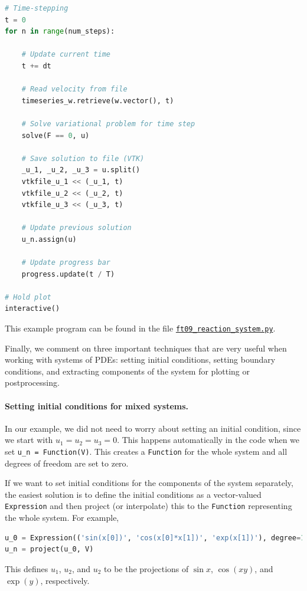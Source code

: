 \documentclass[graybox,envcountchap,sectrefs,final]{svmonodo}
\begin{document}
\begin{lstlisting}[language=Python,style=graycolor]
# Time-stepping
t = 0
for n in range(num_steps):

    # Update current time
    t += dt

    # Read velocity from file
    timeseries_w.retrieve(w.vector(), t)

    # Solve variational problem for time step
    solve(F == 0, u)

    # Save solution to file (VTK)
    _u_1, _u_2, _u_3 = u.split()
    vtkfile_u_1 << (_u_1, t)
    vtkfile_u_2 << (_u_2, t)
    vtkfile_u_3 << (_u_3, t)

    # Update previous solution
    u_n.assign(u)

    # Update progress bar
    progress.update(t / T)

# Hold plot
interactive()
\end{lstlisting}
This example program can be found in the file \href{{https://fenicsproject.org/pub/tutorial/python/vol1/ft09_reaction_system.py}}{\nolinkurl{ft09_reaction_system.py}}.



Finally, we comment on three important techniques that are very useful
when working with systems of PDEs: setting initial conditions, setting
boundary conditions, and extracting components of the system for
plotting or postprocessing.

\paragraph{Setting initial conditions for mixed systems.}

In our example, we did not need to worry about setting an initial
condition, since we start with $u_1 = u_2 = u_3 = 0$. This happens
automatically in the code when we set \Verb!u_n = Function(V)!. This
creates a \texttt{Function} for the whole system and all degrees of freedom
are set to zero.

If we want to set initial conditions for the components of the system
separately, the easiest solution is to define the initial conditions
as a vector-valued \texttt{Expression} and then project (or interpolate) this
to the \texttt{Function} representing the whole system. For example,

\begin{lstlisting}[language=Python,style=graycolor]
u_0 = Expression(('sin(x[0])', 'cos(x[0]*x[1])', 'exp(x[1])'), degree=1)
u_n = project(u_0, V)
\end{lstlisting}
This defines $u_1$, $u_2$, and $u_2$ to be the projections of $\sin
x$, $\cos (xy)$, and $\exp(y)$, respectively.
\end{document}

